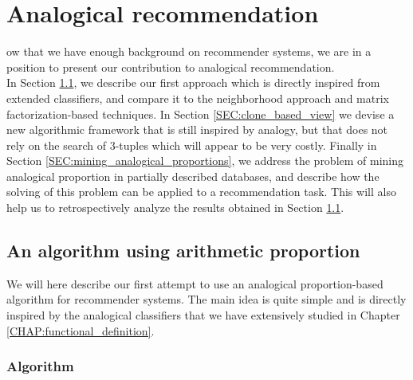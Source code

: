 \chapter{Analogical recommendation}
\label{CHAP:analogical_recommendation}

ow that we have enough background on recommender systems, we are in
a position to present our contribution to analogical recommendation.\\

In Section \ref{SEC:analogical_reco_basic_algo}, we describe our first approach
which is directly inspired from extended classifiers, and compare it to the
neighborhood approach and matrix factorization-based techniques. In Section
\ref{SEC:clone_based_view} we devise a new algorithmic framework that is still
inspired by analogy, but that does not rely on the search of $3$-tuples which
will appear to be very costly. Finally in Section
\ref{SEC:mining_analogical_proportions}, we address the problem of mining
analogical proportion in partially described databases, and describe how the
solving of this problem can be applied to a recommendation task. This will also
help us to retrospectively analyze the results obtained in Section
\ref{SEC:analogical_reco_basic_algo}.

\section{An algorithm using arithmetic proportion}
\label{SEC:analogical_reco_basic_algo}
We will here describe our first attempt to use an analogical proportion-based
algorithm for recommender systems. The main idea is quite simple and is
directly inspired by the analogical classifiers that we have extensively
studied in Chapter \ref{CHAP:functional_definition}.
\subsection{Algorithm}

